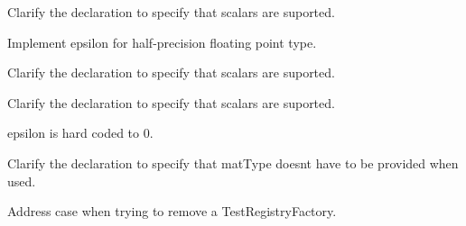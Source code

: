 
\begin{DoxyRefList}
\item[\label{todo__todo000002}%
\hypertarget{todo__todo000002}{}%
Member \hyperlink{group__core__func__integer_gaf5ecf64cbcb7f806a3c7915dd622209b}{glm\+:\+:bit\+Count} (gen\+I\+U\+Type$<$ T $>$ const \&Value)]Clarify the declaration to specify that scalars are suported.  
\item[\label{todo__todo000008}%
\hypertarget{todo__todo000008}{}%
Member \hyperlink{group__gtc__constants_gacb41049b8d22c8aa90e362b96c524feb}{glm\+:\+:epsilon} ()]Implement epsilon for half-\/precision floating point type.  
\item[\label{todo__todo000003}%
\hypertarget{todo__todo000003}{}%
Member \hyperlink{group__core__func__integer_ga43d5d9ec05ba4c46035c764ad5fd3135}{glm\+:\+:find\+L\+SB} (gen\+I\+U\+Type$<$ T $>$ const \&Value)]Clarify the declaration to specify that scalars are suported.  
\item[\label{todo__todo000004}%
\hypertarget{todo__todo000004}{}%
Member \hyperlink{group__core__func__integer_gaee931af2eaecf61b629b33899c9d6f29}{glm\+:\+:find\+M\+SB} (gen\+I\+U\+Type$<$ T $>$ const \&Value)]Clarify the declaration to specify that scalars are suported.  
\item[\label{todo__todo000009}%
\hypertarget{todo__todo000009}{}%
Member \hyperlink{group__gtx__vector__angle_ga6f9cbae1b02b49ad92a1d0070649f038}{glm\+:\+:oriented\+Angle} (detail\+::tvec2$<$ T, P $>$ const \&x, detail\+::tvec2$<$ T, P $>$ const \&y)]epsilon is hard coded to 0.  
\item[\label{todo__todo000005}%
\hypertarget{todo__todo000005}{}%
Member \hyperlink{group__core__func__matrix_gae9f513dc8e4f3ceb993669321b6d0f09}{glm\+:\+:outer\+Product} (vec\+Type\+A$<$ T, P $>$ const \&c, vec\+Type\+B$<$ T, P $>$ const \&r)]Clarify the declaration to specify that mat\+Type doesn\textquotesingle{}t have to be provided when used.  
\item[\label{todo__todo000001}%
\hypertarget{todo__todo000001}{}%
Member \hyperlink{class_test_factory_registry_afa3fb925b07eb34e9ccfab84812afc18}{Test\+Factory\+Registry\+:\+:unregister\+Factory} (\hyperlink{class_test_factory}{Test\+Factory} $\ast$factory)]Address case when trying to remove a Test\+Registry\+Factory. 
\end{DoxyRefList}